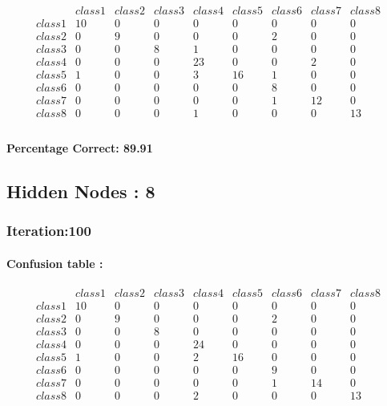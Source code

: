 \documentclass[12pt]{article}
\begin{document}
\[
  \begin{matrix}
   & class1 & class2 & class3 & class4 & class5 & class6 & class7 & class8 \\
class1 &    10 & 0 & 0 & 0 & 0 & 0 & 0 & 0 \\
class2 &    0 & 9 & 0 & 0 & 0 & 2 & 0 & 0 \\
class3 &    0 & 0 & 8 & 1 & 0 & 0 & 0 & 0 \\
class4 &    0 & 0 & 0 & 23 & 0 & 0 & 2 & 0 \\
class5 &    1 & 0 & 0 & 3 & 16 & 1 & 0 & 0 \\
class6 &    0 & 0 & 0 & 0 & 0 & 8 & 0 & 0 \\
class7 &    0 & 0 & 0 & 0 & 0 & 1 & 12 & 0 \\
class8 &    0 & 0 & 0 & 1 & 0 & 0 & 0 & 13 \\
  \end{matrix}
\]

\paragraph*{Percentage Correct: 89.91} 

\subsection*{Hidden Nodes : 8}  


\subsubsection*{Iteration:100}

\paragraph*{Confusion table :}

\[
  \begin{matrix}
   & class1 & class2 & class3 & class4 & class5 & class6 & class7 & class8 \\
 class1 &   10 & 0 & 0 & 0 & 0 & 0 & 0 & 0 \\
 class2 &   0 & 9 & 0 & 0 & 0 & 2 & 0 & 0 \\
 class3 &   0 & 0 & 8 & 0 & 0 & 0 & 0 & 0 \\
 class4 &   0 & 0 & 0 & 24 & 0 & 0 & 0 & 0 \\
 class5 &   1 & 0 & 0 & 2 & 16 & 0 & 0 & 0 \\
 class6 &   0 & 0 & 0 & 0 & 0 & 9 & 0 & 0 \\
 class7 &   0 & 0 & 0 & 0 & 0 & 1 & 14 & 0 \\
 class8 &   0 & 0 & 0 & 2 & 0 & 0 & 0 & 13 \\
  \end{matrix}
\]
\end{document}
